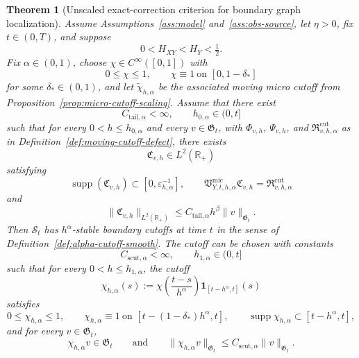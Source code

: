 \documentclass[11pt,a4paper]{amsart}
\theoremstyle{plain}
\newtheorem{theorem}{Theorem}[section]
\theoremstyle{definition}
\theoremstyle{remark}
\newcommand{\R}{\mathbb{R}}
\newcommand{\one}{\mathbf 1}
\begin{document}
\begin{theorem}[Unscaled exact-correction criterion for boundary graph localization]
\label{thm:unscaled-smooth-cutoff-criterion}
Assume Assumptions~\ref{ass:model} and~\ref{ass:obs-source}, let \(\eta>0\), fix \(t\in(0,T)\),
and suppose
\[
0<H_{XY}<H_Y<\tfrac12.
\]
Fix \(\alpha\in(0,1)\), choose \(\chi\in C^\infty([0,1])\) with
\[
0\le \chi\le1,
\qquad
\chi\equiv1\ \text{on }[0,1-\delta_*]
\]
for some \(\delta_*\in(0,1)\), and let \(\widetilde\chi_{h,\alpha}\) be the associated moving micro
cutoff from Proposition~\ref{prop:micro-cutoff-scaling}. Assume that there exist
\[
C_{\mathrm{tail},\alpha}<\infty,
\qquad
h_{0,\alpha}\in(0,t]
\]
such that for every \(0<h\le h_{0,\alpha}\) and every \(v\in\mathfrak G_t\), with
\(\Phi_{v,h}\), \(\Psi_{v,h}\), and \(\mathfrak R_{v,h,\alpha}^{\mathrm{cut}}\) as in
Definition~\ref{def:moving-cutoff-defect}, there exists
\[
\mathfrak C_{v,h}\in L^2(\R_+)
\]
satisfying
\begin{equation}\label{eq:unscaled-cutoff-correction-eq}
\operatorname{supp}(\mathfrak C_{v,h})
\subset [0,\varepsilon_{h,\alpha}^{-1}],
\qquad
\mathfrak V_{Y,t,h,\alpha}^{\mathrm{mic}}\mathfrak C_{v,h}
=
\mathfrak R_{v,h,\alpha}^{\mathrm{cut}}
\end{equation}
and
\begin{equation}\label{eq:unscaled-cutoff-correction-bound}
\|\mathfrak C_{v,h}\|_{L^2(\R_+)}
\le
C_{\mathrm{tail},\alpha}h^\beta\|v\|_{\mathfrak G_t}.
\end{equation}
Then \(\mathcal S_t\) has \(h^\alpha\)-stable boundary cutoffs at time \(t\) in the sense of
Definition~\ref{def:alpha-cutoff-smooth}. The cutoff can be chosen with constants
\[
C_{\mathrm{scut},\alpha}<\infty,
\qquad
h_{1,\alpha}\in(0,t]
\]
such that for every \(0<h\le h_{1,\alpha}\), the cutoff
\[
\chi_{h,\alpha}(s)
:=
\chi\!\left(\frac{t-s}{h^\alpha}\right)\one_{[t-h^\alpha,t]}(s)
\]
satisfies
\[
0\le \chi_{h,\alpha}\le1,
\qquad
\chi_{h,\alpha}\equiv1\ \text{on }[t-(1-\delta_*)h^\alpha,t],
\qquad
\operatorname{supp}\chi_{h,\alpha}\subset[t-h^\alpha,t],
\]
and for every \(v\in\mathfrak G_t\),
\begin{equation}\label{eq:unscaled-cutoff-graph}
\chi_{h,\alpha}v\in\mathfrak G_t
\qquad\text{and}\qquad
\|\chi_{h,\alpha}v\|_{\mathfrak G_t}
\le
C_{\mathrm{scut},\alpha}\|v\|_{\mathfrak G_t}.
\end{equation}
\end{theorem}
\end{document}
